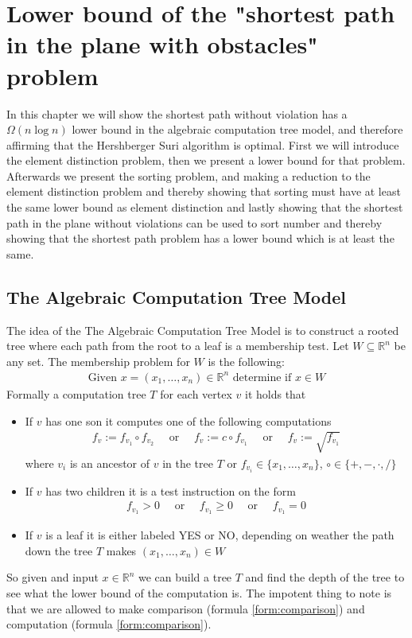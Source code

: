 \chapter{Lower bound of the "shortest path in the plane with obstacles" problem}
\label{chapter:lowerbound}
In this chapter we will show the shortest path without violation has a
$\Omega{(n\log n)}$ lower bound in the algebraic computation tree model, 
and therefore affirming that the Hershberger Suri algorithm is optimal.
First we will introduce the element distinction problem, then we present a
lower bound for that problem. Afterwards we present the sorting problem, and
making a reduction to the element distinction problem and thereby showing that
sorting must have at least the same lower bound as element distinction and
lastly showing that the shortest path in the plane without violations can be
used to sort number and thereby showing that the shortest path problem has a
lower bound which is at least the same.
\section{The Algebraic Computation Tree Model}
The idea of the The Algebraic Computation Tree Model is to construct a rooted
tree where each path from the root to a leaf is a membership test.
Let $W \subseteq \mathbb{R}^n$ be any set. The membership problem for $W$ is
the following:
\begin{align}
	\text{Given } x = (x_1,\dots,x_n) \in \mathbb{R}^n \text{ determine if } x\in W
\end{align}
Formally a computation tree $T$ for each vertex $v$ it holds that
\begin{itemize}
  \item If $v$ has one son it computes one of the following computations
			\begin{align}
				f_v:=f_{v_1} \circ f_{v_2}\quad \text{ or }\quad
				f_v:=c \circ f_{v_1}\quad \text{ or }\quad
				f_v:=\sqrt{f_{v_1}}
				\label{form:computation}
			\end{align}
  	 where $v_i$ is an ancestor of $v$ in the tree $T$ or $f_{v_i}\in
  	 \{x_1,\dots,x_n\}$, $\circ \in \{+,-,\cdot,/\}$
   \item If $v$ has two children it is a test instruction on the form
		\begin{align}
			 f_{v_1}>0\quad \text{ or }\quad
			 f_{v_1}\geq 0\quad \text{ or }\quad
			 f_{v_1}= 0
			 \label{form:comparison}
		\end{align}
   \item If $v$ is a leaf it is either labeled YES or NO, depending on
  	 weather the path down the tree $T$ makes $(x_1,\dots,x_n)\in W$
\end{itemize}
So given and input $x\in \mathbb{R}^n$ we can build a tree $T$ and find the
depth of the tree to see what the lower bound of the computation is.
The impotent thing to note is that we are allowed to make comparison (formula
\ref{form:comparison}) and computation (formula \ref{form:comparison}).

